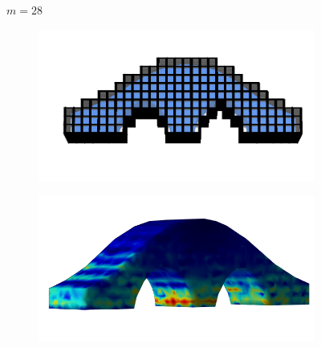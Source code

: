 \documentclass[11pt,titlepage]{article}
\begin{document}
\begin{figure}[!htbp]
\begin{center}
        $m=28$
        \quad
        \begin{subfigure}[b]{0.4\textwidth}
            \centering
            \includegraphics[width=\textwidth]{hex/resized/archbridge_cage_3}
        \end{subfigure}
        \begin{subfigure}[b]{0.35\textwidth}
            \centering
            \includegraphics[width=\textwidth]{hex/resized/archbridge_3}
        \end{subfigure}
    \end{center}


\end{figure}
\end{document}
